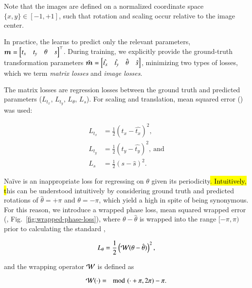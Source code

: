 \noindent Note that the images are defined on a normalized coordinate space $\{x, y\} \in [-1, +1]$, such that rotation and scaling occur relative to the image center.

In practice, the \LocNet{} learns to predict only the relevant parameters, $\bm{m} = \begin{bmatrix}t_x & t_y & \theta & s \end{bmatrix}^\top$.
During training, we explicitly provide the ground-truth transformation parameters $\hat{\bm{m}} = \begin{bmatrix} \hat{t_x} & \hat{t_y} & \hat{\theta} & \hat{s} \end{bmatrix}$, minimizing two types of losses, which we term \emph{matrix losses} and \emph{image losses}.

The matrix losses are regression losses between the ground truth and predicted parameters ($L_{t_x}$, $L_{t_y}$, $L_\theta$, $L_s$).
For scaling and translation, mean squared error (\MSE{}) was used:

\begin{align}
L_{t_x} & = \frac{1}{2} (t_x - \hat{t_x})^2, \label{eqn:attn-mat-loss-tx} \\
L_{t_y} & = \frac{1}{2} (t_y - \hat{t_y})^2, \mathrm{~and} \label{eqn:attn-mat-loss-ty} \\
L_s     & = \frac{1}{2} (s - \hat{s})^2. \label{eqn:attn-mat-loss-s}
\end{align}



Na\"{i}ve \MSE{} is an inappropriate loss for regressing on $\theta$ given its periodicity\hl{.  Intuitively, t}his can be understood intuitively by considering ground truth and predicted rotations of $\hat{\theta} = +\pi$ and $\theta = -\pi$, which yield a high \MSE{} in spite of being synonymous.
For this reason, we introduce a wrapped phase loss, mean squared wrapped error (\MSWE{}, Fig.~\ref{fig:wrapped-phase-loss}), where $\theta - \hat{\theta}$ is wrapped into the range $[-\pi, \pi)$ prior to calculating the standard \MSE{},

\begin{equation}
L_\theta = \frac{1}{2} \left(\mathcal{W}(\theta - \hat{\theta})\right)^2, \label{eqn:attn-mat-loss-r}
\end{equation}

\noindent and the wrapping operator $\mathcal{W}$ is defined as

$$
\mathcal{W}(\cdot) = \mod(\cdot + \pi, 2\pi) - \pi.
$$

